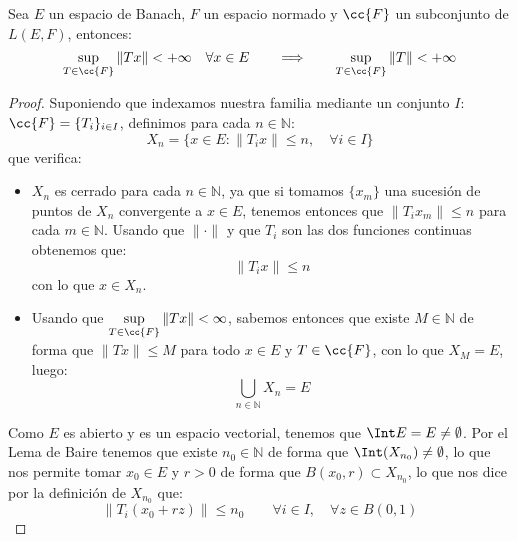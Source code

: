 \begin{teo}
    Sea $E$ un espacio de Banach, $F$ un espacio normado y $\cc{F}$ un subconjunto de $L(E,F)$, entonces:
    \begin{equation*}
        \sup_{T\in \cc{F}}\|Tx\| < +\infty \quad \forall x\in E \qquad \Longrightarrow \qquad  \sup_{T\in \cc{F}}\|T\| < +\infty
    \end{equation*}
    \begin{proof}
        Suponiendo que indexamos nuestra familia mediante un conjunto $I$: $\cc{F} = \{T_i\}_{i \in I}$, definimos para cada $n\in \mathbb{N}$:
        \begin{equation*}
            X_n = \{x\in E : \|T_i x\| \leq n, \quad \forall i \in I\}
        \end{equation*}
        que verifica:
        \begin{itemize}
            \item $X_n$ es cerrado para cada $n\in \mathbb{N}$, ya que si tomamos $\{x_m\}$ una sucesión de puntos de $X_n$ convergente a $x\in E$, tenemos entonces que $\|T_ix_m\| \leq n$ para cada $m\in \mathbb{N}$. Usando que $\|\cdot \|$ y que $T_i$ son las dos funciones continuas obtenemos que:
                \begin{equation*}
                    \|T_ix\| \leq n
                \end{equation*}
                con lo que $x\in X_n$.
            \item Usando que $\sup\limits_{T\in \cc{F}}\|Tx\| < \infty$, sabemos entonces que existe $M\in \mathbb{N}$ de forma que $\|Tx\| \leq M$ para todo $x\in E$ y $T\in \cc{F}$, con lo que $X_M = E$, luego:
                \begin{equation*}
                    \bigcup_{n\in \mathbb{N}}X_n = E
                \end{equation*}
        \end{itemize}
        Como $E$ es abierto y es un espacio vectorial, tenemos que $\Int E = E \neq \emptyset $. Por el Lema de Baire tenemos que existe $n_0\in \mathbb{N}$ de forma que $\Int(X_{n_0})\neq \emptyset $, lo que nos permite tomar $x_0\in E$ y $r>0$ de forma que $B(x_0,r)\subset X_{n_0}$, lo que nos dice por la definición de $X_{n_0}$ que:
        \begin{equation*}
            \|T_i(x_0 + rz)\| \leq n_0 \qquad \forall i \in I, \quad \forall z\in B(0,1)
        \end{equation*}


\end{proof}
\end{teo}
